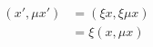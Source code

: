\documentclass[preview]{standalone}
\begin{document}
\begin{align*}
(x',\mu x')& =(\xi x, \xi \mu x)\\ & = \xi (x, \mu x)
\end{align*}
\end{document}
